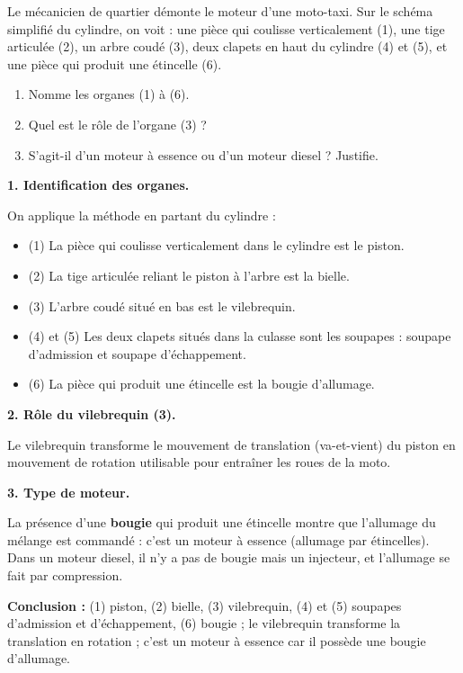 \documentclass[11pt]{article}
\newcommand{\cle}[1]{{\popxbold\color{popdark}#1}}
\begin{document}
\begin{exoresolu}
Le mécanicien de quartier démonte le moteur d'une moto-taxi. Sur le schéma simplifié du cylindre, on voit : une pièce qui coulisse verticalement (1), une tige articulée (2), un arbre coudé (3), deux clapets en haut du cylindre (4) et (5), et une pièce qui produit une étincelle (6).
\begin{enumerate}
\item Nomme les organes (1) à (6).
\item Quel est le rôle de l'organe (3) ?
\item S'agit-il d'un moteur à essence ou d'un moteur diesel ? Justifie.
\end{enumerate}
\tcblower
\textbf{1. Identification des organes.}

On applique la méthode en partant du cylindre :
\begin{itemize}
\item (1) La pièce qui coulisse verticalement dans le cylindre est le \cle{piston}.
\item (2) La tige articulée reliant le piston à l'arbre est la \cle{bielle}.
\item (3) L'arbre coudé situé en bas est le \cle{vilebrequin}.
\item (4) et (5) Les deux clapets situés dans la culasse sont les \cle{soupapes} : soupape d'\cle{admission} et soupape d'\cle{échappement}.
\item (6) La pièce qui produit une étincelle est la \cle{bougie} d'allumage.
\end{itemize}

\textbf{2. Rôle du vilebrequin (3).}

Le vilebrequin transforme le \cle{mouvement de translation} (va-et-vient) du piston en \cle{mouvement de rotation} utilisable pour entraîner les roues de la moto.

\textbf{3. Type de moteur.}

La présence d'une \textbf{bougie} qui produit une étincelle montre que l'allumage du mélange est commandé : c'est un \cle{moteur à essence} (allumage par étincelles). Dans un moteur diesel, il n'y a pas de bougie mais un injecteur, et l'allumage se fait par compression.

\textbf{Conclusion :} (1) piston, (2) bielle, (3) vilebrequin, (4) et (5) soupapes d'admission et d'échappement, (6) bougie ; le vilebrequin transforme la translation en rotation ; c'est un moteur à essence car il possède une bougie d'allumage.
\end{exoresolu}
\end{document}

